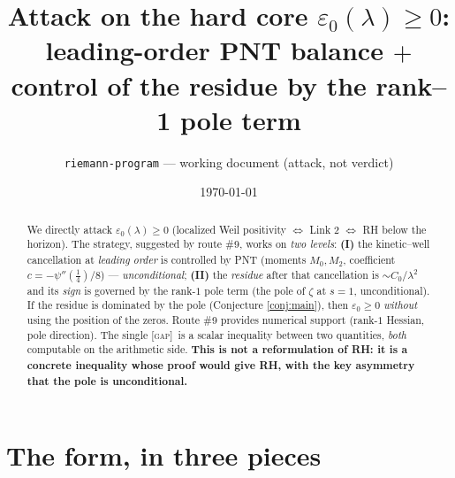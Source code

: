 \documentclass[11pt]{article}
\title{\textbf{Attack on the hard core $\varepsilon_0(\lambda)\ge0$:\\
leading-order PNT balance $+$ control of the residue by the rank--1 pole term}}
\author{\texttt{riemann-program} --- working document (attack, not verdict)}
\date{\today}
\newcommand{\GAP}{\textcolor{red!75!black}{\textsc{[gap]}}}
\theoremstyle{plain}
\theoremstyle{definition}
\begin{document}
\maketitle

\begin{abstract}
We directly attack $\varepsilon_0(\lambda)\ge0$ (localized Weil positivity
$\Leftrightarrow$ Link 2 $\Leftrightarrow$ RH below the horizon). The strategy,
suggested by route \#9, works on \emph{two levels}: \textbf{(I)} the kinetic--well
cancellation at \emph{leading order} is controlled by PNT (moments $M_0,M_2$,
coefficient $c=-\psi''(\tfrac14)/8$) --- \emph{unconditional}; \textbf{(II)} the
\emph{residue} after that cancellation is $\sim C_0/\lambda^2$ and its \emph{sign} is
governed by the rank-$1$ pole term (the pole of $\zeta$ at $s=1$,
unconditional). If the residue is dominated by the pole (Conjecture \ref{conj:main}),
then $\varepsilon_0\ge0$ \emph{without} using the position of the zeros. Route \#9
provides numerical support (rank-$1$ Hessian, pole direction). The single \GAP\ is a
scalar inequality between two quantities, \emph{both} computable on the arithmetic side.
\textbf{This is not a reformulation of RH: it is a concrete inequality whose proof
would give RH, with the key asymmetry that the pole is unconditional.}
\end{abstract}

\tableofcontents

\section{The form, in three pieces}\label{sec:pieces}
\end{document}
